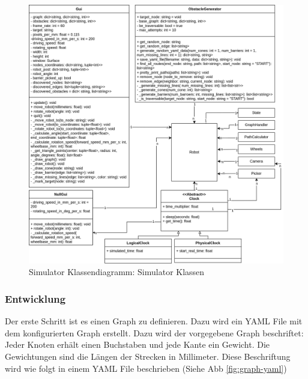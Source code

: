 \begin{figure}[H]
\centering
\includegraphics[width=\textwidth]{assets/informatik-prototyp/simulator/simulator-simulator-erd.png}
\caption{Simulator Klassendiagramm: Simulator Klassen}
\label{fig:simulator-classdia-sim}
\end{figure}

\subsubsection{Entwicklung}

Der erste Schritt ist es einen Graph zu definieren. Dazu wird ein YAML File mit dem konfigurierten Graph erstellt. 
Dazu wird der vorgegebene Graph beschriftet: Jeder Knoten erhält einen Buchstaben und jede Kante ein Gewicht. Die Gewichtungen sind die Längen der Strecken in Millimeter. Diese Beschriftung wird wie folgt in einem YAML File beschrieben (Siehe Abb \ref{fig:graph-yaml})

